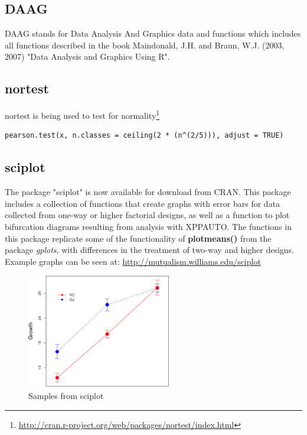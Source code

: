\subsection{DAAG}
\label{sec:daag}

DAAG stands for Data Analysis And Graphics data and functions which
includes all functions described in the book Maindonald, J.H. and
Braun, W.J. (2003, 2007) "Data Analysis and Graphics Using R".

\subsection{nortest}
\label{sec:nortest}

nortest is being used to test for
normality\footnote{\url{http://cran.r-project.org/web/packages/nortest/index.html}}

\begin{lstlisting}
pearson.test(x, n.classes = ceiling(2 * (n^(2/5))), adjust = TRUE)
\end{lstlisting}

\subsection{sciplot}
\label{sec:sciplot}

The package "sciplot" is now available for download from CRAN. This
package includes a collection of functions that create graphs with
error bars for data collected from one-way or higher factorial
designs, as well as a function to plot bifurcation diagrams resulting
from analysis with XPPAUTO. The functions in this package replicate
some of the functionality of {\bf plotmeans()} from the package {\it gplots}, with
differences in the treatment of two-way and higher designs. Example
graphs can be seen at: \url{http://mutualism.williams.edu/sciplot}

\begin{figure}[htb]
    \centerline{\includegraphics[height=5cm]{./images/sciplot_samples.eps}}
    \caption{Samples from sciplot}\label{fig:sciplot_1}
  \end{figure}

